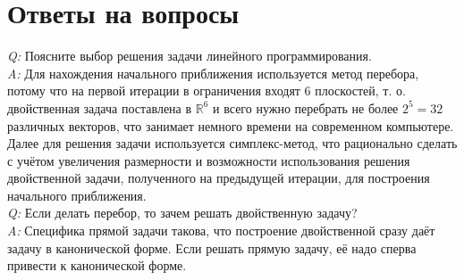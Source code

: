\documentclass[main.tex]{subfiles}
\begin{document}
	\section{Ответы на вопросы}
	\emph{Q:} Поясните выбор решения задачи линейного программирования. \\
	\emph{A:} Для нахождения начального приближения используется метод перебора, потому что на первой итерации в ограничения входят 6 плоскостей, т. о. двойственная задача поставлена в $\mathds{R}^6$ и всего нужно перебрать не более $2^5=32$ различных векторов, что занимает немного времени на современном компьютере. Далее для решения задачи используется симплекс-метод, что рационально сделать с учётом увеличения размерности и возможности использования решения двойственной задачи, полученного на предыдущей итерации, для построения начального приближения.\\
	\emph{Q:} Если делать перебор, то зачем решать двойственную задачу?\\
	\emph{A:} Специфика прямой задачи такова, что построение двойственной сразу даёт задачу в канонической форме. Если решать прямую задачу, её надо сперва привести к канонической форме.
\end{document}
